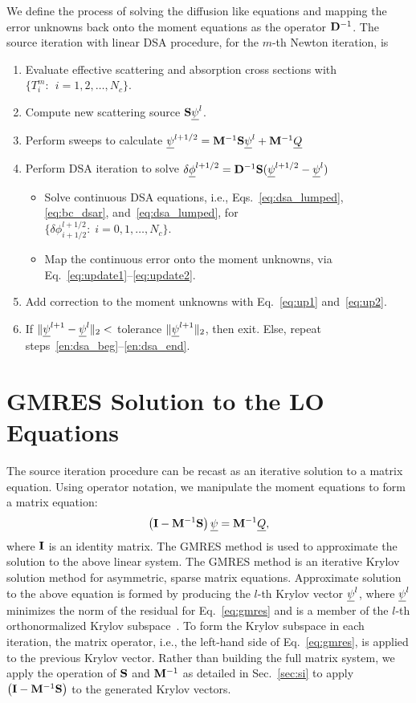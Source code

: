 We define the process of solving the diffusion like equations and mapping the error
unknowns back onto the moment equations as the operator $\mathbf{D}^{-1}$.
The source iteration with linear DSA procedure, for the $m$-th Newton iteration, is
\begin{enumerate}
    \item Evaluate effective scattering and absorption cross sections with
        ${\{T^m_i:\;\, i=1,2,\ldots,N_c\}}$.
    \item\label{en:dsa_beg} Compute new scattering source $\mathbf{S} \underline{\psi}^l$.
    \item Perform sweeps to calculate $\underline{\psi}^{l+1/2} = \mathbf{M}^{-1} \mathbf{S} \underline{\psi}^{l} + \mathbf{M}^{-1} \underline{Q}$
    \item Perform DSA iteration to solve $ \delta \underline{\phi}^{l+1/2} = \mathbf{D}^{-1}
        \mathbf{S}(\underline{\psi}^{l+1/2}-\underline{\psi}^l)$
        \begin{itemize}
    \item Solve continuous DSA equations, i.e., Eqs.~\eqref{eq:dsa_lumped}, \eqref{eq:bc_dsar},
and~\eqref{eq:dsa_lumped}, for \\${\{\delta
            \phi^{l+1/2}_{i+1/2}:\;i=0,1,\ldots,N_c\}}$.
        \item Map the continuous error onto the moment unknowns, via
            Eq.~\eqref{eq:update1}--\eqref{eq:update2}.
    \end{itemize}
\item Add correction to the moment unknowns with Eq.~\eqref{eq:up1} and~\eqref{eq:up2}.
    \item\label{en:dsa_end} If $\|\underline{\psi}^{l+1} - \underline{\psi}^{l} \|_2 < $ tolerance $\|\underline{\psi}^{l+1} \|_2$, then
        exit. Else, repeat steps~\ref{en:dsa_beg}--\ref{en:dsa_end}.
\end{enumerate}

\section{GMRES Solution to the LO Equations}

The source iteration procedure can be recast as an iterative solution to a matrix
equation. Using operator notation, we manipulate
the moment equations to form a matrix equation:
\begin{equation}\label{eq:gmres}
    \left(\mathbf{I}  - \mathbf{M}^{-1}\mathbf{S}\right) \underline{\psi} = \mathbf{M}^{-1} \underline{Q},
\end{equation}
where $\mathbf{I}$ is an identity matrix.  The GMRES method is used to approximate
the solution to the above
linear system. The GMRES method is an iterative Krylov solution method for asymmetric, sparse matrix
equations.  Approximate solution to the above equation is formed by producing the $l$-th
Krylov vector $\underline{\psi}^l$, where $\underline{\psi}^l$ minimizes the norm of the residual for
Eq.~\eqref{eq:gmres} and is a member of the $l$-th orthonormalized Krylov
subspace~\cite{saad}.  To form the Krylov subspace in each iteration, the
matrix operator, i.e., the left-hand side of Eq.~\eqref{eq:gmres}, is applied to the
previous Krylov vector.  Rather than building the full matrix system, we apply the
operation of $\mathbf{S}$ and $\mathbf{M}^{-1}$ as detailed in Sec.~\eqref{sec:si} to apply $\left(\mathbf{I}  - \mathbf{M}^{-1}\mathbf{S}\right)$ to the generated Krylov vectors. 

